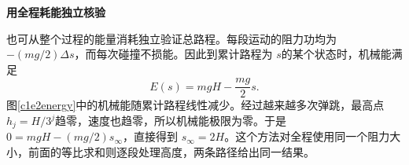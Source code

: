 \begin{solution}
\par\medskip{}\noindent\textbf{用全程耗能独立核验}\par\nobreak
也可从整个过程的能量消耗独立验证总路程。每段运动的阻力功均为 $-(mg/2)\Delta s$，而每次碰撞不损能。因此到累计路程为 $s$的某个状态时，机械能满足
\[E(s)=mgH-\frac{mg}{2}s.\]
图\ref{c1e2energy}中的机械能随累计路程线性减少。经过越来越多次弹跳，最高点 $h_j=H/3^j$趋零，速度也趋零，所以机械能极限为零。于是 $0=mgH-(mg/2)s_\infty$，直接得到 $s_\infty=2H$。这个方法对全程使用同一个阻力大小，前面的等比求和则逐段处理高度，两条路径给出同一结果。
\end{solution}

